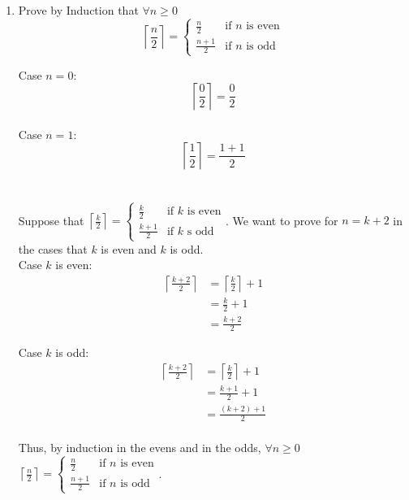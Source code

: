 \documentclass{article}
\begin{document}
\begin{enumerate}
  \item Prove by Induction that $\forall n \geq 0$
  \[
    \left \lceil\frac{n}{2} \right \rceil=
    \left\{
    \begin{array}{ll}
    \frac{n}{2}& \textrm{if $n$ is even}\\
    \frac{n+1}{2}& \textrm{if $n$ is odd}
    \end{array}
    \right.
  \]
  
  Case $n=0$: \\
  \[ \left \lceil\frac{0}{2} \right \rceil = \frac{0}{2}\]
  \\
  Case $n=1$: \\
  \[ \left \lceil\frac{1}{2} \right \rceil = \frac{1+1}{2}\]
  \\
  \\
  Suppose that \(
        \left \lceil\frac{k}{2} \right \rceil=
        \left\{
        \begin{array}{ll}
        \frac{k}{2}& \textrm{if $k$ is even}\\
        \frac{k+1}{2}& \textrm{if $k$ s odd}
        \end{array}
        \right.
    \). We want to prove for $n=k+2$ in the cases that $k$ is even and $k$ is odd. \\
    
  Case $k$ is even: \\
  \begin{equation*}
    \begin{split}
        \left \lceil\frac{k+2}{2} \right \rceil & = \left \lceil\frac{k}{2} \right \rceil + 1 \\
        & = \frac{k}{2} + 1 \\
        & = \frac{k+2}{2}
    \end{split}
  \end{equation*}
  
  Case $k$ is odd: \\
  \begin{equation*}
    \begin{split}
        \left \lceil\frac{k+2}{2} \right \rceil & = \left \lceil\frac{k}{2} \right \rceil + 1 \\
        & = \frac{k+1}{2} + 1 \\
        & = \frac{(k+2)+1}{2}
    \end{split}
  \end{equation*}
  \\
  Thus, by induction in the evens and in the odds, $\forall n \geq 0$
  \(
    \left \lceil\frac{n}{2} \right \rceil=
    \left\{
    \begin{array}{ll}
    \frac{n}{2}& \textrm{if $n$ is even}\\
    \frac{n+1}{2}& \textrm{if $n$ is odd}
    \end{array}
    \right.
  \).
  \\
  

\end{enumerate}
\end{document}
